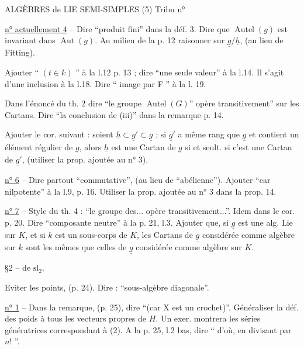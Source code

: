 ALGÈBRES de LIE SEMI-SIMPLES (5) \hfill Tribu n° 

\uline{n° actuellement 4} -- Dire ``produit fini'' dans la déf. 3. Dire que $\operatorname{Autel}(g)$ est invariant dans $\operatorname{Aut}(g)$. Au milieu de la p. 12 raisonner sur $\underline g/\underline h$, (au lieu de Fitting).

Ajouter `` $(t\in k)$ '' à la l.12 p. 13 ; dire ``une seule valeur'' à la l.14. Il s'agit d'une inclusion à la l.18. Dire `` image par F '' à la l. 19.

Dans l'énoncé du th. 2 dire ``le groupe $\operatorname{Autel}(G)$'' opère transitivement'' sur les Cartans. Dire ``la conclusion de (iii)'' dans la remarque p. 14.

Ajouter le cor. suivant : soient $\underline h\subset\underline g'\subset\underline g$ ; si $\underline g'$ a même rang que $\underline g$ et contient un élément régulier de $\underline g$, alors $\underline h$ est une Cartan de $\underline g$ si et seult. si c'est une Cartan de $\underline g'$, (utiliser la prop. ajoutée au n° 3).

\uline{n° 6} -- Dire partout ``commutative'', (au lieu de ``abélienne''). Ajouter ``car nilpotente'' à la l.9, p. 16. Utiliser la prop. ajoutée au n° 3 dans la prop. 14.

\uline{n° 7} -- Style du th. 4 : ``le groupe des... opère transitivement...''. Idem dans le cor. p. 20. Dire ``composante neutre'' à la p. 21, l.3. Ajouter que, si $\underline g$ est une alg. Lie sur $K$, et si $k$ est un sous-corps de $K$, les Cartans de $\underline g$ considérée comme algèbre sur $k$ sont les mêmes que celles de $\underline g$ considérée comme algèbre sur $K$.

\S 2 --  de $\mathrm{sl}_2$.

Eviter les points, (p. 24). Dire : ``sous-algèbre diagonale''.

\uline{n° 1} -- Dans la remarque, (p. 25), dire ``(car X est un crochet)''. Généraliser la déf. des poids à tous les vecteurs propres de $H$. Un exer. montrera les séries génératrices correspondant à (2). A la p. 25, l.2 bas, dire `` d'où, en divisant par $n!$ ''.
